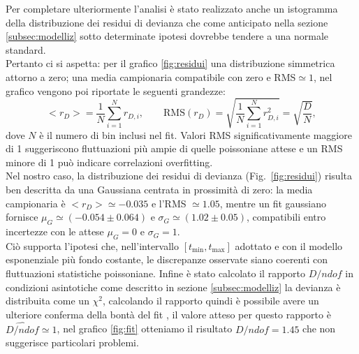 \documentclass[10pt,a4paper]{article}
\begin{document}
\begin{flushleft}
Per completare ulteriormente l'analisi è stato realizzato anche un istogramma della distribuzione dei residui di devianza che come anticipato nella sezione \ref{subsec:modelliz} sotto determinate ipotesi dovrebbe tendere a una normale standard.\\
Pertanto ci si aspetta: per il grafico \ref{fig:residui} una distribuzione simmetrica attorno a zero; una media campionaria compatibile con zero e RMS$\simeq1$, nel grafico vengono poi riportate le seguenti grandezze:
\begin{equation}
<r_D>=\frac{1}{N}\sum_{i=1}^{N} r_{D,i},
\qquad
\mathrm{RMS}(r_D)=\sqrt{\frac{1}{N}\sum_{i=1}^{N} r_{D,i}^2}
=\sqrt{\frac{D}{N}},
\end{equation}
dove $N$ è il numero di bin inclusi nel fit. 
Valori RMS significativamente maggiore di 1 suggeriscono fluttuazioni più ampie di quelle poissoniane attese e un RMS minore di 1 può indicare correlazioni overfitting.\\
Nel nostro caso, la distribuzione dei residui di devianza (Fig.~\ref{fig:residui}) risulta ben descritta da una Gaussiana centrata in prossimità di zero: la media campionaria è $<r_D>\simeq -0.035$ e l’RMS $\simeq 1.05$, mentre un fit gaussiano fornisce $\mu_G \simeq (-0.054\pm 0.064)$ e $\sigma_G \simeq (1.02\pm 0.05)$, compatibili entro incertezze con le attese $\mu_G=0$ e $\sigma_G=1$.\\
Ciò supporta l’ipotesi che, nell’intervallo $[t_{\min},t_{\max}]$ adottato e con il modello esponenziale più fondo costante, le discrepanze osservate siano coerenti con fluttuazioni statistiche poissoniane.
Infine è stato calcolato il rapporto $D/ndof$ in condizioni asintotiche come descritto in sezione \ref{subsec:modelliz} la devianza è distribuita come un $\chi^2$, calcolando il rapporto quindi è possibile avere un ulteriore conferma della bontà del fit , il valore atteso per questo rapporto è $\hat{D/ndof}\simeq 1$, nel grafico \ref{fig:fit} otteniamo il risultato $D/ndof=1.45$ che non suggerisce particolari problemi.


\end{flushleft}
\end{document}
